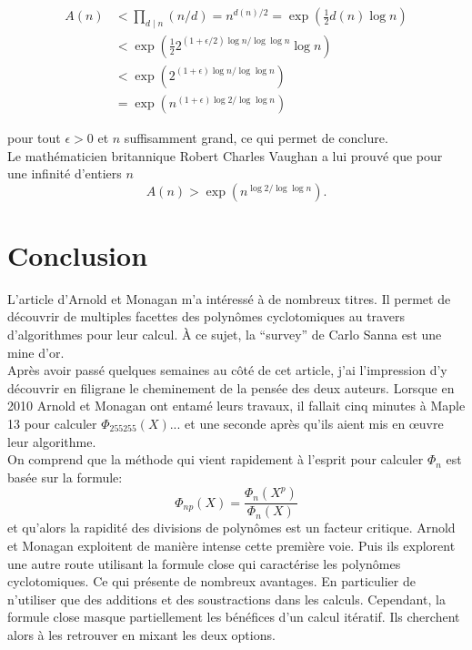 \documentclass{article}
\theoremstyle{break}                  %
\begin{document}
\begin{align*}
	A(n) &< \prod_{d \mid n} (n/d) = n^{d(n)/2} = \exp\left(\frac{1}{2}d(n) \log n\right)\\
	&< \exp\left(\frac{1}{2}2^{(1+\epsilon/2)\log n/ \log \log n}\log n\right)\\
	&< \exp\left(2^{(1+\epsilon)\log n/ \log \log n}\right)\\
	&= \exp\left(n^{(1+\epsilon)\log 2/ \log \log n}\right)
\end{align*}

pour tout $\epsilon > 0$ et $n$ suffisamment grand, ce qui permet de conclure.\\

Le mathématicien britannique Robert Charles Vaughan a lui prouvé que pour une infinité d'entiers $n$
$$A(n) > \exp\left(n^{\log 2/ \log \log n}\right).$$

\section*{Conclusion}
L'article d'Arnold et Monagan m'a intéressé à de nombreux titres. Il permet de découvrir de multiples facettes des polynômes cyclotomiques au travers d'algorithmes pour leur calcul. À ce sujet, la \enquote{survey} \cite{survey} de Carlo Sanna est une mine d'or.\\

Après avoir passé quelques semaines au côté de cet article, j'ai l'impression d'y découvrir en filigrane le cheminement de la pensée des deux auteurs. Lorsque en 2010 Arnold et Monagan ont entamé leurs travaux, il fallait cinq minutes à Maple 13 pour calculer $\Phi_{255255}(X)$... et une seconde après qu'ils aient mis en œuvre leur algorithme.\\

On comprend que la méthode qui vient rapidement à l'esprit pour calculer $\Phi_n$ est basée sur la formule:
$$\Phi_{np}(X) = \frac{\Phi_n(X^p)}{\Phi_n(X)}$$ et qu'alors la rapidité des divisions de polynômes est un facteur critique. Arnold et Monagan exploitent de manière intense cette première voie. Puis ils explorent une autre route utilisant la formule close qui caractérise les polynômes cyclotomiques. Ce qui présente de nombreux avantages. En particulier de n'utiliser que des additions et des soustractions dans les calculs. Cependant, la formule close masque partiellement les bénéfices d'un calcul itératif. Ils cherchent alors à les retrouver en mixant les deux options.\\
\end{document}
